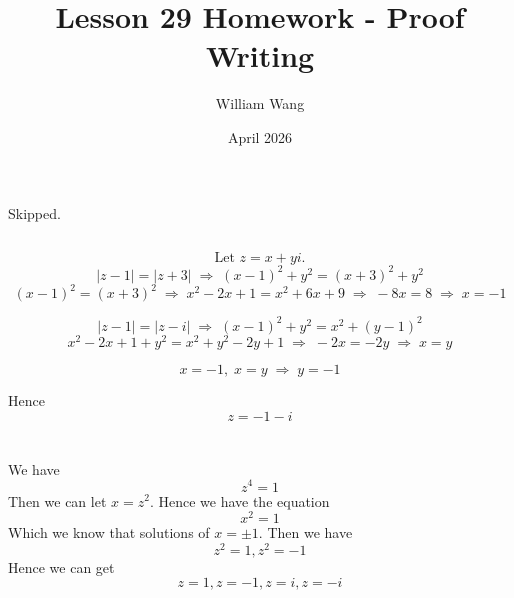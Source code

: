 \documentclass{article}
\title{Lesson 29 Homework - Proof Writing}
\author{William Wang}
\date{April 2026}
\begin{document}
\maketitle

\section{}
\subsection{}
Skipped. 
\subsection{}
\[
\text{Let } z = x + yi.
\]
\[
|z - 1| = |z + 3| \;\Rightarrow\; (x - 1)^2 + y^2 = (x + 3)^2 + y^2
\]
\[
(x - 1)^2 = (x + 3)^2
\;\Rightarrow\; x^2 - 2x + 1 = x^2 + 6x + 9
\;\Rightarrow\; -8x = 8
\;\Rightarrow\; x = -1
\]

\[
|z - 1| = |z - i| \;\Rightarrow\; (x - 1)^2 + y^2 = x^2 + (y - 1)^2
\]
\[
x^2 - 2x + 1 + y^2 = x^2 + y^2 - 2y + 1
\;\Rightarrow\; -2x = -2y
\;\Rightarrow\; x = y
\]

\[
x = -1,\; x = y \;\Rightarrow\; y = -1
\]

Hence
\[
z = -1 - i
\]

\section{}
We have 
\[z^4 = 1\]
Then we can let \(x = z^2\). Hence we have the equation
\[x^2 = 1\]
Which we know that solutions of \(x = \pm 1\). Then we have 
\[z^2 = 1, z^2 = -1\]
Hence we can get
\[z = 1, z = -1, z = i, z= -i\]
\end{document}
